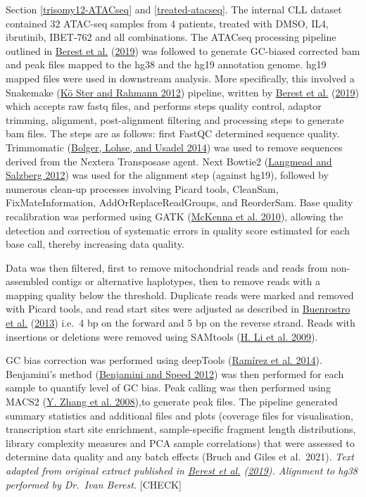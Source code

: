 \documentclass[11pt, a4paper, twosided]{book}
\begin{document}
Section \ref{trisomy12-ATACseq} and \ref{treated-atacseq}. The internal CLL dataset contained 32 ATAC-seq samples from 4 patients, treated with DMSO, IL4, ibrutinib, IBET-762 and all combinations. The ATACseq processing pipeline outlined in \protect\hyperlink{ref-Berest2019}{Berest et al.} (\protect\hyperlink{ref-Berest2019}{2019}) was followed to generate GC-biased corrected bam and peak files mapped to the hg38 and the hg19 annotation genome. hg19 mapped files were used in downstream analysis. More specifically, this involved a Snakemake (\protect\hyperlink{ref-Snakemake}{Kö Ster and Rahmann 2012}) pipeline, written by \protect\hyperlink{ref-Berest2019}{Berest et al.} (\protect\hyperlink{ref-Berest2019}{2019}) which accepts raw fastq files, and performs steps quality control, adaptor trimming, alignment, post-alignment filtering and processing steps to generate bam files. The steps are as follows: first FastQC determined sequence quality. Trimmomatic (\protect\hyperlink{ref-Trimmomatic}{Bolger, Lohse, and Usadel 2014}) was used to remove sequences derived from the Nextera Transposase agent. Next Bowtie2 (\protect\hyperlink{ref-Bowtie2}{Langmead and Salzberg 2012}) was used for the alignment step (against hg19), followed by numerous clean-up processes involving Picard tools, CleanSam, FixMateInformation, AddOrReplaceReadGroups, and ReorderSam. Base quality recalibration was performed using GATK (\protect\hyperlink{ref-GATK}{McKenna et al. 2010}), allowing the detection and correction of systematic errors in quality score estimated for each base call, thereby increasing data quality.

Data was then filtered, first to remove mitochondrial reads and reads from non-assembled contigs or alternative haplotypes, then to remove reads with a mapping quality below the threshold. Duplicate reads were marked and removed with Picard tools, and read start sites were adjusted as described in \protect\hyperlink{ref-Buenrostro2013}{Buenrostro et al.} (\protect\hyperlink{ref-Buenrostro2013}{2013}) i.e.~4 bp on the forward and 5 bp on the reverse strand. Reads with insertions or deletions were removed using SAMtools (\protect\hyperlink{ref-Samtools}{H. Li et al. 2009}).

GC bias correction was performed using deepTools (\protect\hyperlink{ref-deepTools}{Ramírez et al. 2014}). Benjamini's method (\protect\hyperlink{ref-Benjamini2012}{Benjamini and Speed 2012}) was then performed for each sample to quantify level of GC bias. Peak calling was then performed using MACS2 (\protect\hyperlink{ref-MACS2}{Y. Zhang et al. 2008}),to generate peak files. The pipeline generated summary statistics and additional files and plots (coverage files for visualisation, transcription start site enrichment, sample-specific fragment length distributions, library complexity measures and PCA sample correlations) that were assessed to determine data quality and any batch effects (Bruch and Giles et al.~2021). \emph{Text adapted from original extract published in \protect\hyperlink{ref-Berest2019}{Berest et al.} (\protect\hyperlink{ref-Berest2019}{2019}). Alignment to hg38 performed by Dr.~Ivan Berest.} {[}CHECK{]}
\end{document}
